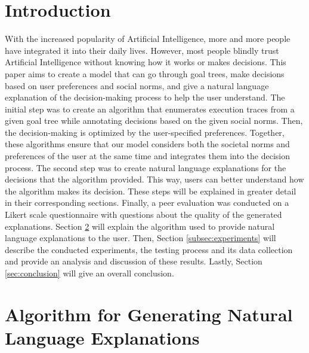 \documentclass[sigconf,nonacm]{acmart}
\begin{document}



\maketitle

\section{Introduction}
With the increased popularity of Artificial Intelligence, more and more people have integrated it into their daily lives. However, most people blindly trust Artificial Intelligence without knowing how it works or makes decisions. This paper aims to create a model that can go through goal trees, make decisions based on user preferences and social norms, and give a natural language explanation of the decision-making process to help the user understand. The initial step was to create an algorithm that enumerates execution traces from a given goal tree while annotating decisions based on the given social norms. Then, the decision-making is optimized by the user-specified preferences. Together, these algorithms ensure that our model considers both the societal norms and preferences of the user at the same time and integrates them into the decision process. The second step was to create natural language explanations for the decisions that the algorithm provided. This way, users can better understand how the algorithm makes its decision. These steps will be explained in greater detail in their corresponding sections. Finally, a peer evaluation was conducted on a Likert scale questionnaire with questions about the quality of the generated explanations.
Section \ref{sec:algorithm} will explain the algorithm used to provide natural language explanations to the user. Then, Section \ref{subsec:experiments} will describe the conducted experiments, the testing process and its data collection and provide an analysis and discussion of these results. Lastly, Section \ref{sec:conclusion}
 will give an overall conclusion.

\section{Algorithm for Generating Natural Language Explanations} \label{sec:algorithm}
\end{document}

